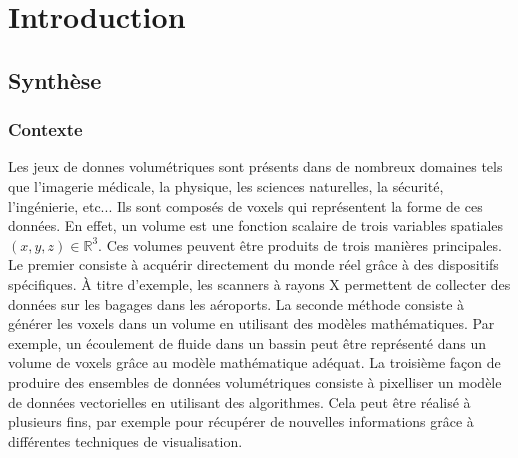 
\chapter{Introduction} %

\label{Introduction} %


\newcommand{\keyword}[1]{\textbf{#1}}
\newcommand{\tabhead}[1]{\textbf{#1}}
\newcommand{\code}[1]{\texttt{#1}}
\newcommand{\file}[1]{\texttt{\bfseries#1}}
\newcommand{\option}[1]{\texttt{\itshape#1}}


\section{Synthèse}

\subsection{Contexte}
Les jeux de donnes volumétriques sont présents dans de nombreux domaines tels que l'imagerie médicale, la physique, les sciences naturelles, la sécurité, l'ingénierie, etc... Ils sont composés de voxels qui représentent la forme de ces données. En effet, un volume est une fonction scalaire de trois variables spatiales $ (x, y, z) \in \mathbb{R}^3$. Ces volumes peuvent être produits de trois manières principales. Le premier consiste à acquérir directement du monde réel grâce à des dispositifs spécifiques. À titre d'exemple, les scanners à rayons X permettent de collecter des données sur les bagages dans les aéroports. La seconde méthode consiste à générer les voxels dans un volume en utilisant des modèles mathématiques. Par exemple, un écoulement de fluide dans un bassin peut être représenté dans un volume de voxels grâce au modèle mathématique adéquat. La troisième façon de produire des ensembles de données volumétriques consiste à pixelliser un modèle de données vectorielles en utilisant des algorithmes. Cela peut être réalisé à plusieurs fins, par exemple pour récupérer de nouvelles informations grâce à différentes techniques de visualisation.


